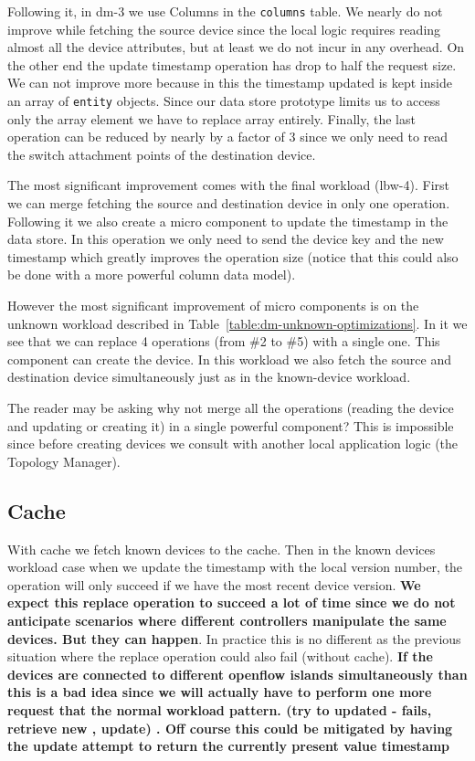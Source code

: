 Following it, in dm-3 we use Columns in the \texttt{columns} table. 
We  nearly do not improve  while fetching the source device since the local logic requires reading
almost all the device attributes, but at least we do not incur in any
overhead.
On the other end the update timestamp operation has drop to half the request size. 
We can not improve more because in this the timestamp updated is kept inside an array of \texttt{entity} objects. 
Since our data store prototype limits us to access only the array element we  have to replace  array entirely. 
Finally, the last operation can be reduced by nearly by a factor of 3 since we only need to read the switch attachment points of the destination device. 

The most significant improvement comes with the final workload (lbw-4). 
First we can merge fetching the source and destination device in only one operation.
Following it we also create a micro component to update the timestamp in the data store.
In this operation we only need to send the device key and the new timestamp which greatly improves the operation size (notice that this could also be done with a more powerful column data model).  

However the most significant improvement of micro components  is on the unknown workload described in Table~\ref{table:dm-unknown-optimizations}. 
In it we see that we can replace 4 operations (from \#2 to \#5) with a single one. 
This component can create the device. 
In this workload we also fetch the source and destination device simultaneously just as in the known-device workload. 

The reader may be asking why not merge all the operations (reading the device and updating or creating it) in a single powerful component? 
This is impossible since before creating devices we consult with another local application logic (the Topology Manager). 

\subsection{Cache}
With cache we fetch known devices to the cache. Then in the known
devices workload case when we update the timestamp with the local version
number, the operation will only succeed if we have the most recent
device version.  \textbf{We expect this replace operation to succeed a lot of
time since we do not anticipate scenarios where different controllers
manipulate the same devices. But they can happen}. In practice this is
no different as the previous situation where the replace operation
could also fail (without cache). \textbf{If the devices are connected to different openflow
islands simultaneously than this is a bad idea since we will actually
have to perform one more request that the normal workload
pattern. (try to updated - fails, retrieve new , update) . Off course
this could be mitigated by having the update attempt to return the
currently present value timestamp}



